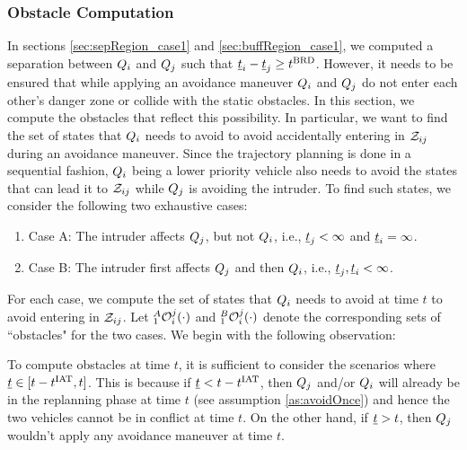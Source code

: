 \subsubsection{Obstacle Computation} \label{sec:intruderObs_case1}
In sections \ref{sec:sepRegion_case1} and \ref{sec:buffRegion_case1}, we computed a separation between $Q_i$ and $Q_j$ such that $\underline{t}_i - \underline{t}_j \geq t^\text{BRD}$. However, it needs to be ensured that while applying an avoidance maneuver $Q_i$ and $Q_j$ do not enter each other's danger zone or collide with the static obstacles. In this section, we compute the obstacles that reflect this possibility. In particular, we want to find the set of states that $Q_i$ needs to avoid to avoid accidentally entering in $\mathcal{Z}_{ij}$ during an avoidance maneuver. Since the trajectory planning is done in a sequential fashion, $Q_i$ being a lower priority vehicle also needs to avoid the states that can lead it to $\mathcal{Z}_{ij}$ while $Q_j$ is avoiding the intruder. To find such states, we consider the following two exhaustive cases:
\begin{enumerate}
\item Case A: The intruder affects $Q_j$, but not $Q_i$, i.e., $\underline{t}_j < \infty$ and $\underline{t}_i = \infty$.
\item Case B: The intruder first affects $Q_j$ and then $Q_i$, i.e., $\underline{t}_j, \underline{t}_i < \infty$.
\end{enumerate}
For each case, we compute the set of states that $Q_i$ needs to avoid at time $t$ to avoid entering in $\mathcal{Z}_{ij}$. Let $_1^A\mathcal{O}_i^j(\cdot)$ and $_1^B\mathcal{O}_i^j(\cdot)$ denote the corresponding sets of ``obstacles" for the two cases. We begin with the following observation: 
\begin{observation} \label{obs1_case1Obs}
To compute obstacles at time $t$, it is sufficient to consider the scenarios where $\underline{t} \in [t-t^\text{IAT}, t]$. This is because if $\underline{t} < t - t^\text{IAT}$, then $Q_j$ and/or $Q_i$ will already be in the replanning phase at time $t$ (see assumption \ref{as:avoidOnce}) and hence the two vehicles cannot be in conflict at time $t$. On the other hand, if $\underline{t} > t$, then $Q_j$ wouldn't apply any avoidance maneuver at time $t$. 
\end{observation}

